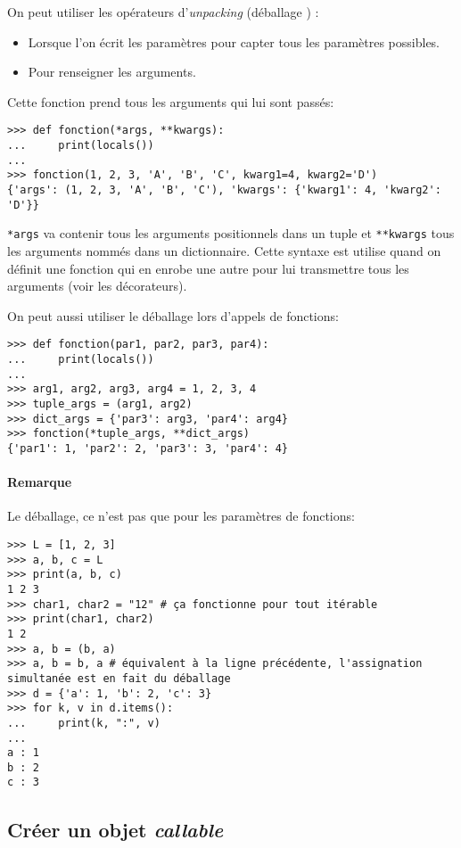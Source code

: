 On peut utiliser les opérateurs d'\emph{unpacking} (\og déballage \fg{}) :
\begin{itemize}
    \item Lorsque l'on écrit les paramètres pour capter tous les paramètres possibles.
    \item Pour renseigner les arguments.
\end{itemize}

Cette fonction prend tous les arguments qui lui sont passés:
\begin{verbatim}
>>> def fonction(*args, **kwargs):
...     print(locals())
...
>>> fonction(1, 2, 3, 'A', 'B', 'C', kwarg1=4, kwarg2='D')
{'args': (1, 2, 3, 'A', 'B', 'C'), 'kwargs': {'kwarg1': 4, 'kwarg2': 'D'}}
\end{verbatim}

\texttt{*args} va contenir tous les arguments positionnels dans un tuple et \texttt{**kwargs}
tous les arguments nommés dans un dictionnaire. Cette syntaxe est utilise quand on définit une fonction qui en enrobe une
autre pour lui transmettre tous les arguments (voir les décorateurs).\medskip

On peut aussi utiliser le déballage lors d'appels de fonctions:
\begin{verbatim}
>>> def fonction(par1, par2, par3, par4):
...     print(locals())
...
>>> arg1, arg2, arg3, arg4 = 1, 2, 3, 4
>>> tuple_args = (arg1, arg2)
>>> dict_args = {'par3': arg3, 'par4': arg4}
>>> fonction(*tuple_args, **dict_args)
{'par1': 1, 'par2': 2, 'par3': 3, 'par4': 4}
\end{verbatim}

\paragraph*{Remarque} Le déballage, ce n'est pas que pour les paramètres de fonctions:
\begin{verbatim}
>>> L = [1, 2, 3]
>>> a, b, c = L
>>> print(a, b, c)
1 2 3
>>> char1, char2 = "12" # ça fonctionne pour tout itérable
>>> print(char1, char2)
1 2
>>> a, b = (b, a)
>>> a, b = b, a # équivalent à la ligne précédente, l'assignation simultanée est en fait du déballage
>>> d = {'a': 1, 'b': 2, 'c': 3}
>>> for k, v in d.items():
...     print(k, ":", v)
... 
a : 1
b : 2
c : 3
\end{verbatim}

\subsection{Créer un objet {\normalfont\bfseries\itshape callable}}

